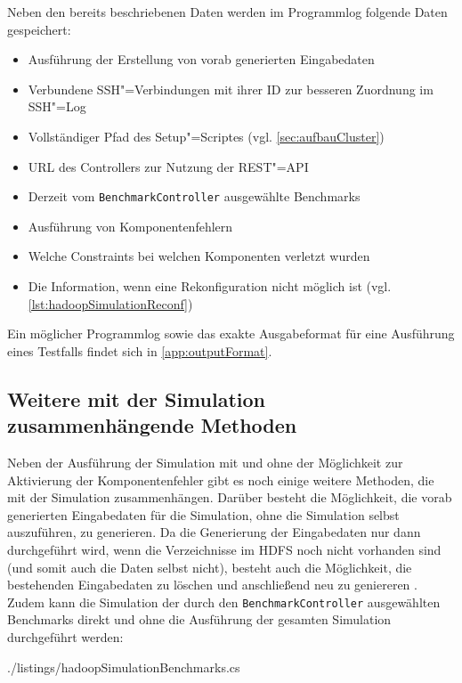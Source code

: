 Neben den bereits beschriebenen Daten werden im Programmlog folgende Daten gespeichert:

\begin{itemize}
    \item Ausführung der Erstellung von vorab generierten Eingabedaten
    \item Verbundene SSH"=Verbindungen mit ihrer ID zur besseren Zuordnung im SSH"=Log
    \item Vollständiger Pfad des Setup"=Scriptes (vgl. \autoref{sec:aufbauCluster})
    \item URL des Controllers zur Nutzung der REST"=API
    \item Derzeit vom \texttt{BenchmarkController} ausgewählte Benchmarks
    \item Ausführung von Komponentenfehlern
    \item Welche Constraints bei welchen Komponenten verletzt wurden
    \item Die Information, wenn eine Rekonfiguration nicht möglich ist (vgl. \autoref{lst:hadoopSimulationReconf})
\end{itemize}

Ein möglicher Programmlog sowie das exakte Ausgabeformat für eine Ausführung eines Testfalls findet sich in \autoref{app:outputFormat}.

\subsection{Weitere mit der Simulation zusammenhängende Methoden}
\label{sec:simulationUtilities}

Neben der Ausführung der Simulation mit und ohne der Möglichkeit zur Aktivierung der Komponentenfehler gibt es noch einige weitere Methoden, die mit der Simulation zusammenhängen.
Darüber besteht die Möglichkeit, die vorab generierten Eingabedaten für die Simulation, ohne die Simulation selbst auszuführen, zu generieren.
Da die Generierung der Eingabedaten nur dann durchgeführt wird, wenn die Verzeichnisse im \ac{HDFS} noch nicht vorhanden sind (und somit auch die Daten selbst nicht), besteht auch die Möglichkeit, die bestehenden Eingabedaten zu löschen und anschließend neu zu geniereren .
Zudem kann die Simulation der durch den \texttt{BenchmarkController} ausgewählten Benchmarks direkt und ohne die Ausführung der gesamten Simulation durchgeführt werden:


{./listings/hadoopSimulationBenchmarks.cs}
